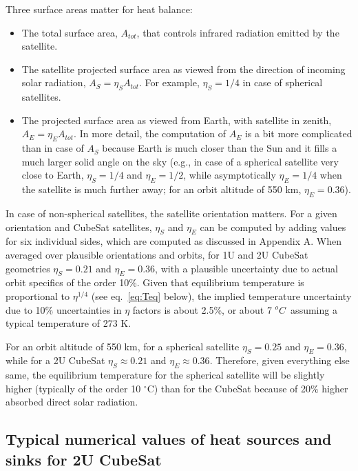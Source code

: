 \documentclass[]{aastex62}
\def\dC     {\hbox{$^{o}C$}}
\begin{document}
Three surface areas matter for heat balance: 
\begin{itemize}
\item The total surface area, $A_{tot}$, that controls infrared radiation emitted by the satellite.
\item The satellite projected surface area as viewed from the direction of incoming solar radiation, $A_S=\eta_SA_{tot}$.
     For example, $\eta_S= 1/4$ in case of spherical satellites. 
\item The projected surface area as viewed from Earth, with satellite in zenith, $A_E=\eta_EA_{tot}$. In more
   detail, the computation of $A_E$ is a bit more complicated than in case of $A_S$ because Earth is much closer
   than the Sun and it fills a much larger solid angle on the sky (e.g., in case of a spherical satellite very 
   close to Earth, $\eta_S = 1/4$ and $\eta_E = 1/2$, while asymptotically $\eta_E = 1/4$ when the satellite
   is much further away; for an orbit altitude of 550 km, $\eta_E =0.36$). 
\end{itemize}

In case of non-spherical satellites, the satellite orientation matters. For a given orientation and CubeSat
satellites, $\eta_S$ and $\eta_E$ can be computed by adding values for six individual sides, which are 
computed as discussed in Appendix A.  When averaged over plausible orientations and orbits, 
for 1U and 2U CubeSat geometries $\eta_S = 0.21$ and $\eta_E = 0.36$, with a plausible uncertainty due to
actual orbit specifics of the order 10\%. 
Given that equilibrium temperature is proportional to 
$\eta^{1/4}$ (see eq.~\ref{eq:Teq} below), the implied temperature uncertainty due to 10\% uncertainties 
in $\eta$ factors is about 2.5\%, or about 7 \dC\ assuming a typical temperature of 273 K. 

For an orbit altitude of 550 km, for a spherical satellite $\eta_S = 0.25$ and $\eta_E =0.36$, while
for a 2U CubeSat $\eta_S \approx 0.21$ and $\eta_E \approx 0.36$. Therefore, given everything else same, 
the equilibrium temperature for the spherical satellite will be slightly higher (typically of the order 
10 $^\circ$C) than for the CubeSat because of 20\% higher absorbed direct solar radiation. 


\subsection{Typical numerical values of heat sources and sinks for 2U CubeSat} 
\end{document}
